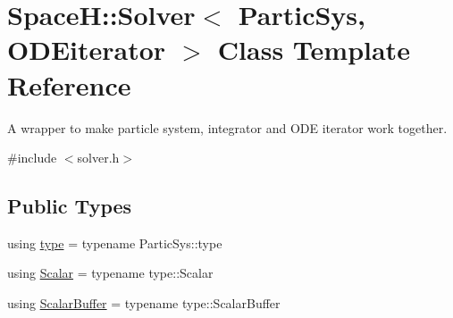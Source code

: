 \hypertarget{class_space_h_1_1_solver}{}\section{SpaceH\+:\+:Solver$<$ Partic\+Sys, O\+D\+Eiterator $>$ Class Template Reference}
\label{class_space_h_1_1_solver}


A wrapper to make particle system, integrator and O\+DE iterator work together.  




{\ttfamily \#include $<$solver.\+h$>$}

\subsection*{Public Types}
\begin{DoxyCompactItemize}
\item 
using \mbox{\hyperlink{class_space_h_1_1_solver_a6f82bc1008c7f769d2c95bdcbb49e463}{type}} = typename Partic\+Sys\+::type
\item 
using \mbox{\hyperlink{class_space_h_1_1_solver_aa0ade682bd07e13fef77e7dcbeb6b46a}{Scalar}} = typename type\+::\+Scalar
\item 
using \mbox{\hyperlink{class_space_h_1_1_solver_a218013786e16f411e8c72cb82a180a05}{Scalar\+Buffer}} = typename type\+::\+Scalar\+Buffer
\end{DoxyCompactItemize}
